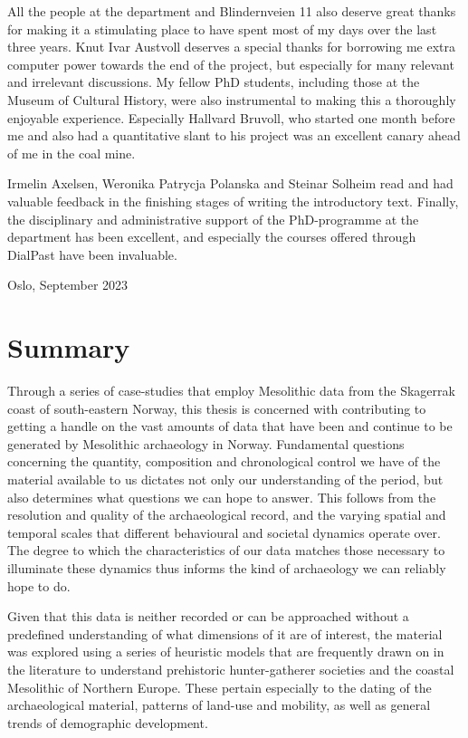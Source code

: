 All the people at the department and Blindernveien 11 also deserve great thanks for making it a stimulating place to have spent most of my days over the last three years. Knut Ivar Austvoll deserves a special thanks for borrowing me extra computer power towards the end of the project, but especially for many relevant and irrelevant discussions. My fellow PhD students, including those at the Museum of Cultural History, were also instrumental to making this a thoroughly enjoyable experience. Especially Hallvard Bruvoll, who started one month before me and also had a quantitative slant to his project was an excellent canary ahead of me in the coal mine.

Irmelin Axelsen, Weronika Patrycja Polanska and Steinar Solheim read and had valuable feedback in the finishing stages of writing the introductory text. Finally, the disciplinary and administrative support of the PhD-programme at the department has been excellent, and especially the courses offered through DialPast have been invaluable.

\bigskip
\noindent
Oslo, September 2023
\newpage

\section*{Summary}
Through a series of case-studies that employ Mesolithic data from the Skagerrak coast of south-eastern Norway, this thesis is concerned with contributing to getting a handle on the vast amounts of data that have been and continue to be generated by Mesolithic archaeology in Norway. Fundamental questions concerning the quantity, composition and chronological control we have of the material available to us dictates not only our understanding of the period, but also determines what questions we can hope to answer. This follows from the resolution and quality of the archaeological record, and the varying spatial and temporal scales that different behavioural and societal dynamics operate over. The degree to which the characteristics of our data matches those necessary to illuminate these dynamics thus informs the kind of archaeology we can reliably hope to do.   

Given that this data is neither recorded or can be approached without a predefined understanding of what dimensions of it are of interest, the material was explored using a series of heuristic models that are frequently drawn on in the literature to understand prehistoric hunter-gatherer societies and the coastal Mesolithic of Northern Europe. These pertain especially to the dating of the archaeological material, patterns of land-use and mobility, as well as general trends of demographic development. 

